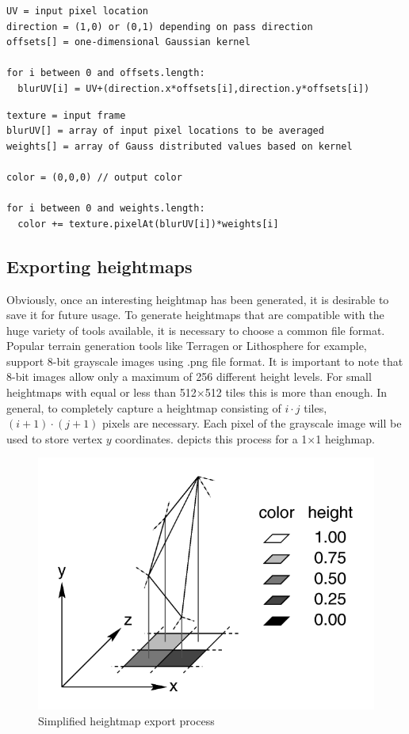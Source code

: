 \documentclass[11pt,a4paper,twoside,openright]{report}
\begin{document}
\newpage
\begin{lstlisting}[caption=Two-pass Gaussian filter vertex shader pseudocode, label=lst:gaussvert]
UV = input pixel location
direction = (1,0) or (0,1) depending on pass direction
offsets[] = one-dimensional Gaussian kernel

for i between 0 and offsets.length:
  blurUV[i] = UV+(direction.x*offsets[i],direction.y*offsets[i])
\end{lstlisting}

\begin{lstlisting}[caption=Two-pass Gaussian filter fragment shader pseudocode, label=lst:gaussfrag]
texture = input frame
blurUV[] = array of input pixel locations to be averaged
weights[] = array of Gauss distributed values based on kernel

color = (0,0,0) // output color

for i between 0 and weights.length:
  color += texture.pixelAt(blurUV[i])*weights[i]
\end{lstlisting}

\subsection{Exporting heightmaps}
\label{subsec:exportingheightmaps}
Obviously, once an interesting heightmap has been generated, it is desirable to save it for future usage. To generate heightmaps that are compatible with the huge variety of tools available, it is necessary to choose a common file format. Popular terrain generation tools like Terragen or Lithosphere for example, support 8-bit grayscale images using .png file format. It is important to note that 8-bit images allow only a maximum of 256 different height levels. For small heightmaps with equal or less than 512$\times$512 tiles this is more than enough. In general, to completely capture a heightmap consisting of $i \cdot j$ tiles, $(i+1) \cdot (j+1)$ pixels are necessary. Each pixel of the grayscale image will be used to store vertex $y$ coordinates.  depicts this process for a 1$\times$1 heighmap.

\begin{figure}[h]
\centering
\includegraphics[width=0.4\linewidth]{pixhfld.png}
\caption{
  Simplified heightmap export process \cite{POVRay:HeightField}
}
\label{fig:heightfield}
\end{figure}
\end{document}
